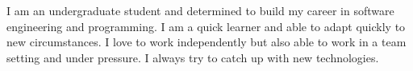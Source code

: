 

\begin{cvparagraph}

I am an undergraduate student and determined to build my career in software engineering and programming. I am a quick learner and able to adapt quickly to new circumstances. I love to work independently but also able to work in a team setting and under pressure. I always try to catch up with new technologies.
\end{cvparagraph}

